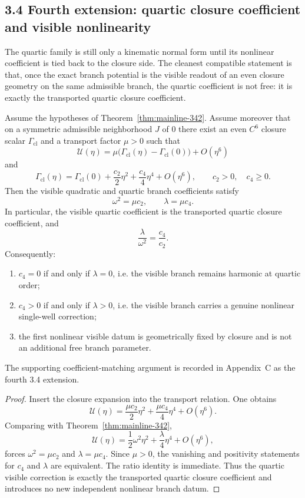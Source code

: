 \subsection*{3.4 Fourth extension: quartic closure coefficient and visible nonlinearity}
The quartic family is still only a kinematic normal form until its nonlinear coefficient is tied back to the closure side. The cleanest compatible statement is that, once the exact branch potential is the visible readout of an even closure geometry on the same admissible branch, the quartic coefficient is not free: it is exactly the transported quartic closure coefficient.

\begin{theorem}
\label{thm:mainline-343}
Assume the hypotheses of Theorem~\ref{thm:mainline-342}. Assume moreover that on a symmetric admissible neighborhood $J$ of $0$ there exist an even $C^6$ closure scalar $\Gamma_{\mathrm{cl}}$ and a transport factor $\mu>0$ such that
\[
  \mathcal U(\eta)=\mu\bigl(\Gamma_{\mathrm{cl}}(\eta)-\Gamma_{\mathrm{cl}}(0)\bigr)+O(\eta^6)
\]
and
\[
  \Gamma_{\mathrm{cl}}(\eta)
  =\Gamma_{\mathrm{cl}}(0)+\frac{c_2}{2}\eta^2+\frac{c_4}{4}\eta^4+O(\eta^6),
  \qquad c_2>0,\quad c_4\ge 0.
\]
Then the visible quadratic and quartic branch coefficients satisfy
\[
  \omega^2=\mu c_2,
  \qquad
  \lambda=\mu c_4.
\]
In particular, the visible quartic coefficient is the transported quartic closure coefficient, and
\[
  \frac{\lambda}{\omega^2}=\frac{c_4}{c_2}.
\]
Consequently:
\begin{enumerate}[label=(\roman*)]
  \item $c_4=0$ if and only if $\lambda=0$, i.e. the visible branch remains harmonic at quartic order;
  \item $c_4>0$ if and only if $\lambda>0$, i.e. the visible branch carries a genuine nonlinear single-well correction;
  \item the first nonlinear visible datum is geometrically fixed by closure and is not an additional free branch parameter.
\end{enumerate}
The supporting coefficient-matching argument is recorded in Appendix~C as the fourth 3.4 extension.
\end{theorem}

\begin{proof}
Insert the closure expansion into the transport relation. One obtains
\[
  \mathcal U(\eta)
  =\frac{\mu c_2}{2}\eta^2+\frac{\mu c_4}{4}\eta^4+O(\eta^6).
\]
Comparing with Theorem~\ref{thm:mainline-342},
\[
  \mathcal U(\eta)=\frac12\omega^2\eta^2+\frac{\lambda}{4}\eta^4+O(\eta^6),
\]
forces $\omega^2=\mu c_2$ and $\lambda=\mu c_4$. Since $\mu>0$, the vanishing and positivity statements for $c_4$ and $\lambda$ are equivalent. The ratio identity is immediate. Thus the quartic visible correction is exactly the transported quartic closure coefficient and introduces no new independent nonlinear branch datum.
\end{proof}



